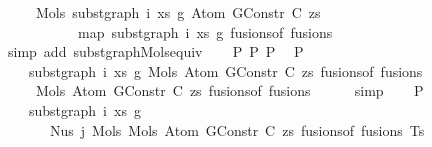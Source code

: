 \begin{isabellebody}
\ \ \ \ \ Mols{}\ {\isacharparenleft}{\kern0pt}subst{\isacharunderscore}{\kern0pt}graph\ i\ xs\ g{}\ {\isacharparenleft}{\kern0pt}Atom\ {\isacharparenleft}{\kern0pt}GConstr\ C{\isacharparenright}{\kern0pt}\ zs{\isacharparenright}{\kern0pt}{\isacharparenright}{\kern0pt}\isanewline
\ \ \ \ \ \ \ \ \ \ \ {\isacharparenleft}{\kern0pt}map\ {\isacharparenleft}{\kern0pt}subst{\isacharunderscore}{\kern0pt}graph\ i\ xs\ g{}{\isacharparenright}{\kern0pt}\ {\isacharparenleft}{\kern0pt}fusions{\isacharunderscore}{\kern0pt}of\ fusions{\isacharparenright}{\kern0pt}{\isacharparenright}{\kern0pt}{\isachardoublequoteclose}\isanewline
\ \ \ \ \isamarkupfalse%
\ {\isacharparenleft}{\kern0pt}simp\ add{\isacharcolon}{\kern0pt}\ subst{\isacharunderscore}{\kern0pt}graph{\isacharunderscore}{\kern0pt}Mols{}{\isacharunderscore}{\kern0pt}equiv{\isacharparenright}{\kern0pt}\isanewline
\isanewline
\ \ \isamarkupfalse%
\ P{}\ P{}\ P{}\ \isamarkupfalse%
\ P{}{\isacharcolon}{\kern0pt}\isanewline
\ \ \ \ {\isachardoublequoteopen}subst{\isacharunderscore}{\kern0pt}graph\ i\ xs\ g{}\ {\isacharparenleft}{\kern0pt}Mols{}\ {\isacharparenleft}{\kern0pt}Atom\ {\isacharparenleft}{\kern0pt}GConstr\ C{\isacharparenright}{\kern0pt}\ zs{\isacharparenright}{\kern0pt}\ {\isacharparenleft}{\kern0pt}fusions{\isacharunderscore}{\kern0pt}of\ fusions{\isacharparenright}{\kern0pt}{\isacharparenright}{\kern0pt}\ {\isacharequal}{\kern0pt}\isanewline
\ \ \ \ \ Mols{}\ {\isacharparenleft}{\kern0pt}Atom\ {\isacharparenleft}{\kern0pt}GConstr\ C{\isacharparenright}{\kern0pt}\ zs{\isacharparenright}{\kern0pt}\ {\isacharparenleft}{\kern0pt}fusions{\isacharunderscore}{\kern0pt}of\ fusions{\isacharparenright}{\kern0pt}{\isachardoublequoteclose}\isanewline
\ \ \ \ \isamarkupfalse%
\ simp\isanewline
\isanewline
\isanewline
\ \ \isamarkupfalse%
\ P{}{\isacharcolon}{\kern0pt}\isanewline
\ \ \ \ {\isachardoublequoteopen}subst{\isacharunderscore}{\kern0pt}graph\ i\ xs\ g{}\isanewline
\ \ \ \ \ \ \ {\isacharparenleft}{\kern0pt}Nus{}\ j\ {\isacharparenleft}{\kern0pt}Mols{}\ {\isacharparenleft}{\kern0pt}Mols{}\ {\isacharparenleft}{\kern0pt}Atom\ {\isacharparenleft}{\kern0pt}GConstr\ C{\isacharparenright}{\kern0pt}\ zs{\isacharparenright}{\kern0pt}\ {\isacharparenleft}{\kern0pt}fusions{\isacharunderscore}{\kern0pt}of\ fusions{\isacharparenright}{\kern0pt}{\isacharparenright}{\kern0pt}\ Ts{\isacharparenright}{\kern0pt}{\isacharparenright}{\kern0pt}\ {\isacharequal}{\kern0pt}\isanewline

\end{isabellebody}
